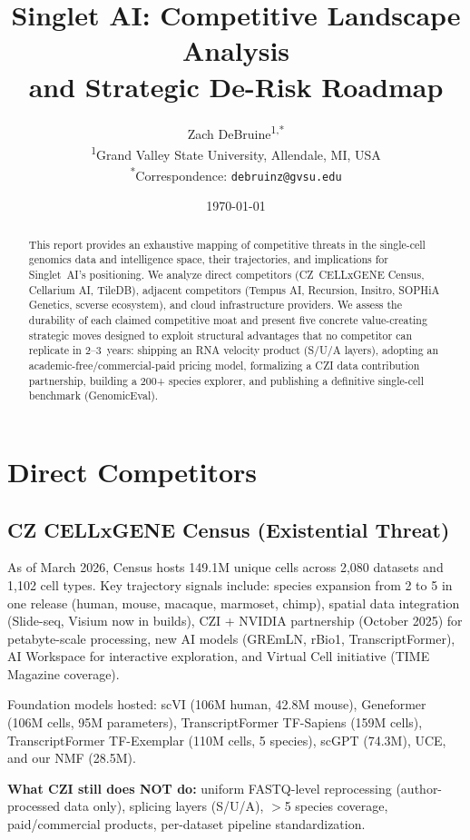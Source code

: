 \documentclass[10pt,twocolumn,letterpaper]{article}
\title{Singlet AI: Competitive Landscape Analysis\\
  and Strategic De-Risk Roadmap}
\author{%
  Zach DeBruine\textsuperscript{1,*}\\[4pt]
  \textsuperscript{1}Grand Valley State University, Allendale, MI, USA\\
  \textsuperscript{*}Correspondence: \texttt{debruinz@gvsu.edu}
}
\date{\today}
\begin{document}
\maketitle

\begin{abstract}
This report provides an exhaustive mapping of competitive threats in the
single-cell genomics data and intelligence space, their trajectories, and
implications for Singlet~AI's positioning. We analyze direct competitors
(CZ~CELLxGENE Census, Cellarium AI, TileDB), adjacent competitors (Tempus AI,
Recursion, Insitro, SOPHiA Genetics, scverse ecosystem), and cloud
infrastructure providers. We assess the durability of each claimed competitive
moat and present five concrete value-creating strategic moves designed to exploit
structural advantages that no competitor can replicate in 2--3~years: shipping
an RNA velocity product (S/U/A layers), adopting an academic-free/commercial-paid
pricing model, formalizing a CZI data contribution partnership, building a 200+
species explorer, and publishing a definitive single-cell benchmark (GenomicEval).
\end{abstract}

\section{Direct Competitors}
\label{sec:direct}

\subsection{CZ CELLxGENE Census (Existential Threat)}

As of March 2026, Census hosts 149.1M unique cells across 2,080 datasets and
1,102 cell types. Key trajectory signals include: species expansion from 2 to
5 in one release (human, mouse, macaque, marmoset, chimp), spatial data
integration (Slide-seq, Visium now in builds), CZI + NVIDIA partnership
(October 2025) for petabyte-scale processing, new AI models (GREmLN, rBio1,
TranscriptFormer), AI Workspace for interactive exploration, and Virtual Cell
initiative (TIME Magazine coverage).

Foundation models hosted: scVI (106M human, 42.8M mouse), Geneformer (106M cells,
95M parameters), TranscriptFormer TF-Sapiens (159M cells), TranscriptFormer
TF-Exemplar (110M cells, 5 species), scGPT (74.3M), UCE, and our NMF (28.5M).

\textbf{What CZI still does NOT do:} uniform FASTQ-level reprocessing (author-processed
data only), splicing layers (S/U/A), $>$5 species coverage, paid/commercial
products, per-dataset pipeline standardization.
\end{document}
